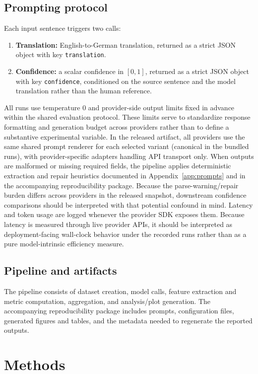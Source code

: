 \documentclass[10pt,conference]{IEEEtran}
\begin{document}
\subsection{Prompting protocol}
Each input sentence triggers two calls:
\begin{enumerate}[leftmargin=*]
\item \textbf{Translation:} English-to-German translation, returned as a strict JSON object with key \texttt{translation}.
\item \textbf{Confidence:} a scalar confidence in $[0,1]$, returned as a strict JSON object with key \texttt{confidence}, conditioned on the source sentence and the model translation rather than the human reference.
\end{enumerate}
All runs use temperature 0 and provider-side output limits fixed in advance within the shared evaluation protocol. These limits serve to standardize response formatting and generation budget across providers rather than to define a substantive experimental variable. In the released artifact, all providers use the same shared prompt renderer for each selected variant (canonical in the bundled runs), with provider-specific adapters handling API transport only. When outputs are malformed or missing required fields, the pipeline applies deterministic extraction and repair heuristics documented in Appendix~\ref{app:prompts} and in the accompanying reproducibility package. Because the parse-warning/repair burden differs across providers in the released snapshot, downstream confidence comparisons should be interpreted with that potential confound in mind. Latency and token usage are logged whenever the provider SDK exposes them. Because latency is measured through live provider APIs, it should be interpreted as deployment-facing wall-clock behavior under the recorded runs rather than as a pure model-intrinsic efficiency measure.

\subsection{Pipeline and artifacts}
The pipeline consists of dataset creation, model calls, feature extraction and metric computation, aggregation, and analysis/plot generation. The accompanying reproducibility package includes prompts, configuration files, generated figures and tables, and the metadata needed to regenerate the reported outputs.

\section{Methods}
\end{document}
